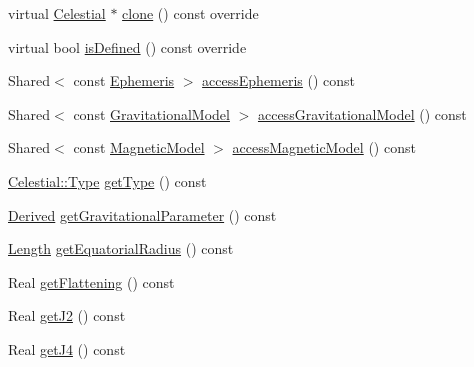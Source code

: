 \begin{DoxyCompactItemize}
\item 
virtual \hyperlink{classostk_1_1physics_1_1env_1_1obj_1_1_celestial}{Celestial} $\ast$ \hyperlink{classostk_1_1physics_1_1env_1_1obj_1_1_celestial_a87c6f3ec3c0ec9758ae52e3edc3fc5df}{clone} () const override
\item 
virtual bool \hyperlink{classostk_1_1physics_1_1env_1_1obj_1_1_celestial_a611b8fe6fcd3787bbf9981ad99dfe471}{is\+Defined} () const override
\item 
Shared$<$ const \hyperlink{classostk_1_1physics_1_1env_1_1_ephemeris}{Ephemeris} $>$ \hyperlink{classostk_1_1physics_1_1env_1_1obj_1_1_celestial_a381edd898ce5b55e533a250a8212cf1b}{access\+Ephemeris} () const
\item 
Shared$<$ const \hyperlink{namespaceostk_1_1physics_1_1env_1_1obj_a50c0bc72e8880f2fa2a910a81e050c97}{Gravitational\+Model} $>$ \hyperlink{classostk_1_1physics_1_1env_1_1obj_1_1_celestial_ad498343cdb085c4bb626442e69c583b0}{access\+Gravitational\+Model} () const
\item 
Shared$<$ const \hyperlink{namespaceostk_1_1physics_1_1env_1_1obj_a11552c1290e2f6b4693ea00c2df2c80d}{Magnetic\+Model} $>$ \hyperlink{classostk_1_1physics_1_1env_1_1obj_1_1_celestial_a3bf6a51759025bf14f1d766348548b22}{access\+Magnetic\+Model} () const
\item 
\hyperlink{classostk_1_1physics_1_1env_1_1obj_1_1_celestial_aa0711d887522b35b2b3630156d912779}{Celestial\+::\+Type} \hyperlink{classostk_1_1physics_1_1env_1_1obj_1_1_celestial_ad5b0fb87f14be14519ecddd37f134719}{get\+Type} () const
\item 
\hyperlink{classostk_1_1physics_1_1units_1_1_derived}{Derived} \hyperlink{classostk_1_1physics_1_1env_1_1obj_1_1_celestial_a433a6bf852e23db369fec77f02e90647}{get\+Gravitational\+Parameter} () const
\item 
\hyperlink{classostk_1_1physics_1_1units_1_1_length}{Length} \hyperlink{classostk_1_1physics_1_1env_1_1obj_1_1_celestial_ad0d484832d406c1e5b57cab731f839f3}{get\+Equatorial\+Radius} () const
\item 
Real \hyperlink{classostk_1_1physics_1_1env_1_1obj_1_1_celestial_ac57af98c82cfc344f24d1a91f45e99ff}{get\+Flattening} () const
\item 
Real \hyperlink{classostk_1_1physics_1_1env_1_1obj_1_1_celestial_ac7b892c6433c93f227d53f59285aac1d}{get\+J2} () const
\item 
Real \hyperlink{classostk_1_1physics_1_1env_1_1obj_1_1_celestial_a8c117d675e0a8c46cc6bb1b7bfdbf87c}{get\+J4} () const
\item 

\end{DoxyCompactItemize}
